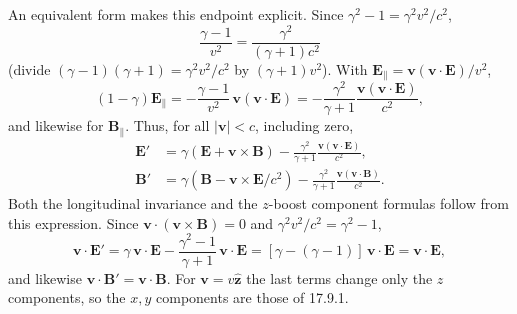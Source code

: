 An equivalent form makes this endpoint explicit. Since
$\gamma^2-1=\gamma^2v^2/c^2$,
\[
\frac{\gamma-1}{v^2}=\frac{\gamma^2}{(\gamma+1)c^2}
\]
(divide $(\gamma-1)(\gamma+1)=\gamma^2v^2/c^2$ by $(\gamma+1)v^2$).
With $\mathbf E_\parallel=\mathbf v(\mathbf v\cdot\mathbf E)/v^2$,
\[
(1-\gamma)\mathbf E_\parallel
=-\frac{\gamma-1}{v^2}\,\mathbf v(\mathbf v\cdot\mathbf E)
=-\frac{\gamma^2}{\gamma+1}\frac{\mathbf v(\mathbf v\cdot\mathbf E)}{c^2},
\]
and likewise for $\mathbf B_\parallel$.
Thus, for all $|\mathbf v|<c$, including zero,
\[
\boxed{\begin{aligned}
\mathbf E'&=\gamma(\mathbf E+\mathbf v\times\mathbf B)
-\frac{\gamma^2}{\gamma+1}\frac{\mathbf v(\mathbf v\cdot\mathbf E)}{c^2},\\
\mathbf B'&=\gamma(\mathbf B-\mathbf v\times\mathbf E/c^2)
-\frac{\gamma^2}{\gamma+1}\frac{\mathbf v(\mathbf v\cdot\mathbf B)}{c^2}.
\end{aligned}}
\]
Both the longitudinal invariance and the $z$-boost component
formulas follow from this expression. Since
$\mathbf v\cdot(\mathbf v\times\mathbf B)=0$ and
$\gamma^2v^2/c^2=\gamma^2-1$,
\[
\mathbf v\cdot\mathbf E'=\gamma\,\mathbf v\cdot\mathbf E
-\frac{\gamma^2-1}{\gamma+1}\,\mathbf v\cdot\mathbf E
=[\gamma-(\gamma-1)]\,\mathbf v\cdot\mathbf E=\mathbf v\cdot\mathbf E,
\]
and likewise $\mathbf v\cdot\mathbf B'=\mathbf v\cdot\mathbf B$. For
$\mathbf v=v\hat{\mathbf z}$ the last terms change only the $z$
components, so the $x,y$ components are those of 17.9.1.

